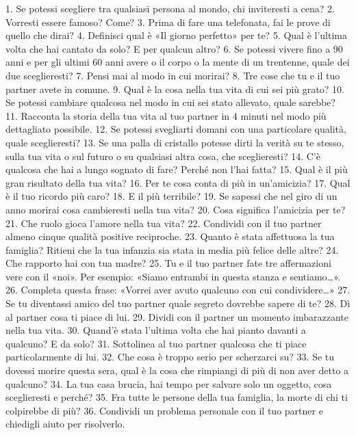 \documentclass[12pt]{book} %
\begin{document}
1. Se potessi scegliere tra qualsiasi persona al mondo, chi inviteresti a cena?
2. Vorresti essere famoso? Come?
3. Prima di fare una telefonata, fai le prove di quello che dirai?
4. Definisci qual è «Il giorno perfetto» per te?
5. Qual è l’ultima volta che hai cantato da solo? E per qualcun altro?
6. Se potessi vivere fino a 90 anni e per gli ultimi 60 anni avere o il corpo o la mente di un trentenne, quale dei due sceglieresti?
7. Pensi mai al modo in cui morirai?
8. Tre cose che tu e il tuo partner avete in comune.
9. Qual è la cosa nella tua vita di cui sei più grato?
10. Se potessi cambiare qualcosa nel modo in cui sei stato allevato, quale sarebbe?
11. Racconta la storia della tua vita al tuo partner in 4 minuti nel modo più dettagliato possibile.
12. Se potessi svegliarti domani con una particolare qualità, quale sceglieresti?
13. Se una palla di cristallo potesse dirti la verità su te stesso, sulla tua vita o sul futuro o su qualsiasi altra cosa, che sceglieresti?
14. C’è qualcosa che hai a lungo sognato di fare? Perché non l’hai fatta?
15. Qual è il più gran risultato della tua vita?
16. Per te cosa conta di più in un’amicizia?
17. Qual è il tuo ricordo più caro?
18. E il più terribile?
19. Se sapessi che nel giro di un anno morirai cosa cambieresti nella tua vita?
20. Cosa significa l’amicizia per te?
21. Che ruolo gioca l’amore nella tua vita?
22. Condividi con il tuo partner almeno cinque qualità positive reciproche.
23. Quanto è stata affettuosa la tua famiglia? Ritieni che la tua infanzia sia stata in media più felice delle altre?
24. Che rapporto hai con tua madre?
25. Tu e il tuo partner fate tre affermazioni vere con il «noi». Per esempio: «Siamo entrambi in questa stanza e sentiamo…».
26. Completa questa frase: «Vorrei aver avuto qualcuno con cui condividere…»
27. Se tu diventassi amico del tuo partner quale segreto dovrebbe sapere di te?
28. Dì al partner cosa ti piace di lui.
29. Dividi con il partner un momento imbarazzante nella tua vita.
30. Quand’è stata l’ultima volta che hai pianto davanti a qualcuno? E da solo?
31. Sottolinea al tuo partner qualcosa che ti piace particolarmente di lui.
32. Che cosa è troppo serio per scherzarci su?
33. Se tu dovessi morire questa sera, qual è la cosa che rimpiangi di più di non aver detto a qualcuno?
34. La tua casa brucia, hai tempo per salvare solo un oggetto, cosa sceglieresti e perché?
35. Fra tutte le persone della tua famiglia, la morte di chi ti colpirebbe di più?
36. Condividi un problema personale con il tuo partner e chiedigli aiuto per risolverlo.
\end{document}

